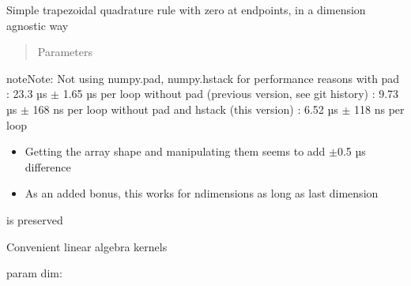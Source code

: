 \documentclass[letterpaper,10pt,english]{sphinxmanual}
\begin{document}
\begin{fulllineitems}
\label{\detokenize{documentation:elastica._calculus.quadrature_kernel}}
Simple trapezoidal quadrature rule with zero at end\sphinxhyphen{}points, in a dimension agnostic way
\begin{quote}\begin{description}
\item[{Parameters}] \leavevmode
{} \textendash{} 

\end{description}\end{quote}

\begin{sphinxadmonition}{note}{Note:}
Not using numpy.pad, numpy.hstack for performance reasons
with pad : 23.3 µs \(\pm\) 1.65 µs per loop
without pad (previous version, see git history) : 9.73 µs \(\pm\) 168 ns per loop
without pad and hstack (this version) : 6.52 µs \(\pm\) 118 ns per loop
\begin{itemize}
\item {} 
Getting the array shape and manipulating them seems to add \(\pm\)0.5 µs difference

\item {} 
As an added bonus, this works for n\sphinxhyphen{}dimensions as long as last dimension

\end{itemize}

is preserved
\end{sphinxadmonition}

\end{fulllineitems}

\label{\detokenize{documentation:module-elastica._linalg}}
Convenient linear algebra kernels

\begin{fulllineitems}
\label{\detokenize{documentation:elastica._linalg.levi_civita_tensor}}
param dim:

\end{fulllineitems}
\end{document}
